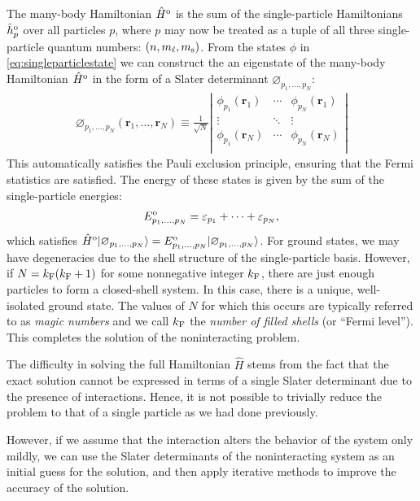 The many-body Hamiltonian $\hat H^{\text o}$ is the sum of the single-particle
Hamiltonians $\hat h^{\text o}_p$ over all particles $p$, where $p$ may now be
treated as a tuple of all three single-particle quantum numbers:
$(n, m_\ell, m_{\text s})$.  From the states $\phi$ in
\eqref{eq:singleparticlestate} we can construct the an eigenstate of the
many-body Hamiltonian $\hat H^{\text o}$ in the form of a Slater determinant
$\varnothing_{p_1, \ldots, p_N}$:
\begin{align*}
  \varnothing_{p_1, \ldots, p_N}(\bm r_1, \ldots, \bm r_N) \equiv
  \frac{1}{\sqrt{N}} \left|
  \begin{matrix}
    \phi_{p_1}(\bm r_1) & \cdots & \phi_{p_N}(\bm r_1) \\
    \vdots & \ddots & \vdots \\
    \phi_{p_1}(\bm r_N) & \cdots & \phi_{p_N}(\bm r_N) \\
  \end{matrix}
  \right|
\end{align*}
This automatically satisfies the Pauli exclusion principle, ensuring that the
Fermi statistics are satisfied.  The energy of these states is given by the
sum of the single-particle energies:
\begin{align*}
  E^{\text o}_{p_1, \ldots, p_N} =
  \varepsilon_{p_1} + \cdots + \varepsilon_{p_N},
\end{align*}
which satisfies
$\hat{H}^{\text o} | \varnothing_{p_1, \ldots, p_N} \rangle = E^{\text o}_{p_1, \ldots,
  p_N} | \varnothing_{p_1, \ldots, p_N} \rangle$.  For ground states, we may have
degeneracies due to the shell structure of the single-particle basis.
However, if $N = k_{\text F} (k_{\text F} + 1)$ for some nonnegative integer
$k_{\text F}$, there are just enough particles to form a closed-shell system.
In this case, there is a unique, well-isolated ground state.  The values of
$N$ for which this occurs are typically referred to as \textit{magic numbers}
and we call $k_{\text F}$ the \textit{number of filled shells} (or ``Fermi
level'').  This completes the solution of the noninteracting problem.

The difficulty in solving the full Hamiltonian $\hat H$ stems from the fact
that the exact solution cannot be expressed in terms of a single Slater
determinant due to the presence of interactions.  Hence, it is not possible to
trivially reduce the problem to that of a single particle as we had done
previously.

However, if we assume that the interaction alters the behavior of the system
only mildly, we can use the Slater determinants of the noninteracting system
as an initial guess for the solution, and then apply iterative methods to
improve the accuracy of the solution.

